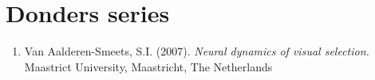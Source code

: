 \chapter*{Donders series}

\begin{enumerate}
\item Van Aalderen-Smeets, S.I. (2007). \emph{Neural dynamics of visual selection.} Maastrict University, Maastricht, The Netherlands
\end{enumerate}
